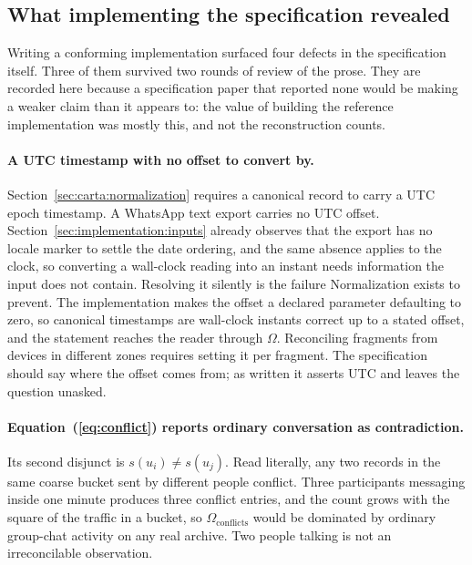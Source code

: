 \subsection{What implementing the specification revealed}
\label{sec:discussion:specfindings}

Writing a conforming implementation surfaced four defects in the specification
itself. Three of them survived two rounds of review of the prose. They are
recorded here because a specification paper that reported none would be making a
weaker claim than it appears to: the value of building the reference
implementation was mostly this, and not the reconstruction counts.

\paragraph{A UTC timestamp with no offset to convert by.}
Section~\ref{sec:carta:normalization} requires a canonical record to carry a UTC
epoch timestamp. A WhatsApp text export carries no UTC offset.
Section~\ref{sec:implementation:inputs} already observes that the export has no
locale marker to settle the date ordering, and the same absence applies to the
clock, so converting a wall-clock reading into an instant needs information the
input does not contain. Resolving it silently is the failure Normalization exists
to prevent. The implementation makes the offset a declared parameter defaulting
to zero, so canonical timestamps are wall-clock instants correct up to a stated
offset, and the statement reaches the reader through
$\Omega$. Reconciling fragments from devices in different zones requires setting
it per fragment. The specification should say where the offset comes from; as
written it asserts UTC and leaves the question unasked.

\paragraph{Equation~(\ref{eq:conflict}) reports ordinary conversation as
contradiction.} Its second disjunct is $s(u_i) \neq s(u_j)$. Read literally, any
two records in the same coarse bucket sent by different people conflict. Three
participants messaging inside one minute produces three conflict entries, and the
count grows with the square of the traffic in a bucket, so
$\Omega_{\text{conflicts}}$ would be dominated by ordinary group-chat activity on
any real archive. Two people talking is not an irreconcilable observation.

